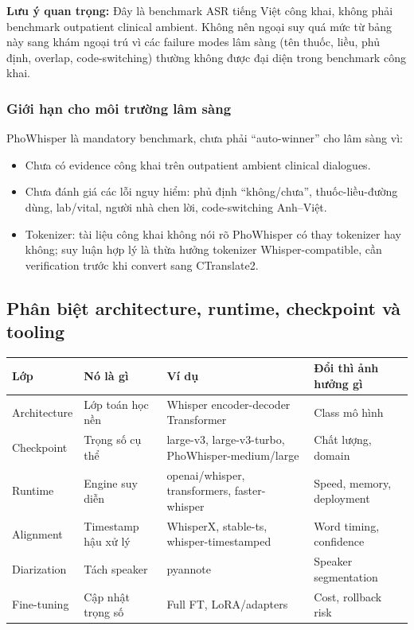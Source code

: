 \textbf{Lưu ý quan trọng:} Đây là benchmark ASR tiếng Việt công khai, không phải benchmark outpatient clinical ambient. Không nên ngoại suy quá mức từ bảng này sang khám ngoại trú vì các failure modes lâm sàng (tên thuốc, liều, phủ định, overlap, code-switching) thường không được đại diện trong benchmark công khai.

\subsubsection{Giới hạn cho môi trường lâm sàng}

PhoWhisper là mandatory benchmark, chưa phải ``auto-winner'' cho lâm sàng vì:
\begin{itemize}
    \item Chưa có evidence công khai trên outpatient ambient clinical dialogues.
    \item Chưa đánh giá các lỗi nguy hiểm: phủ định ``không/chưa'', thuốc-liều-đường dùng, lab/vital, người nhà chen lời, code-switching Anh--Việt.
    \item Tokenizer: tài liệu công khai không nói rõ PhoWhisper có thay tokenizer hay không; suy luận hợp lý là thừa hưởng tokenizer Whisper-compatible, cần verification trước khi convert sang CTranslate2.
\end{itemize}

\subsection{Phân biệt architecture, runtime, checkpoint và tooling}

\begin{small}
\begin{longtable}{p{2.5cm} p{4cm} p{4cm} p{3.5cm}}
\toprule
\textbf{Lớp} & \textbf{Nó là gì} & \textbf{Ví dụ} & \textbf{Đổi thì ảnh hưởng gì} \\
\midrule
Architecture & Lớp toán học nền & Whisper encoder-decoder Transformer & Class mô hình \\
\midrule
Checkpoint & Trọng số cụ thể & large-v3, large-v3-turbo, PhoWhisper-medium/large & Chất lượng, domain \\
\midrule
Runtime & Engine suy diễn & openai/whisper, transformers, faster-whisper & Speed, memory, deployment \\
\midrule
Alignment & Timestamp hậu xử lý & WhisperX, stable-ts, whisper-timestamped & Word timing, confidence \\
\midrule
Diarization & Tách speaker & pyannote & Speaker segmentation \\
\midrule
Fine-tuning & Cập nhật trọng số & Full FT, LoRA/adapters & Cost, rollback risk \\
\bottomrule
\end{longtable}
\end{small}


